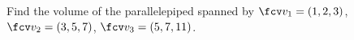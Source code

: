 \begin{frame}
\begin{example}
Find the volume of the parallelepiped spanned by $\fcv v_1=(1,2,3)$, $\fcv v_2=(3,5,7)$, $\fcv v_3=(5,7,11)$.
\end{example}
\end{frame}
